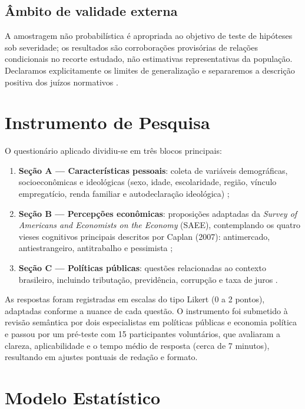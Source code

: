 \subsection{Âmbito de validade externa}
A amostragem não probabilística é apropriada ao objetivo de teste de hipóteses sob severidade; os resultados são corroborações provisórias de relações condicionais no recorte estudado, não estimativas representativas da população. Declaramos explicitamente os limites de generalização e separaremos a descrição positiva dos juízos normativos \cite{hausman2008}.


\section{Instrumento de Pesquisa}

O questionário aplicado dividiu-se em três blocos principais:
\begin{enumerate}[label=\alph*)]
    \item \textbf{Seção A — Características pessoais}: coleta de variáveis demográficas, socioeconômicas e ideológicas (sexo, idade, escolaridade, região, vínculo empregatício, renda familiar e autodeclaração ideológica) \cite{downs1957economic,kahan2012polarization};
    \item \textbf{Seção B — Percepções econômicas}: proposições adaptadas da \textit{Survey of Americans and Economists on the Economy} (SAEE), contemplando os quatro vieses cognitivos principais descritos por Caplan (2007): antimercado, antiestrangeiro, antitrabalho e pessimista \cite{blendon1997,Systematically_Biased_Beliefs_about_Economics};
    \item \textbf{Seção C — Políticas públicas}: questões relacionadas ao contexto brasileiro, incluindo tributação, previdência, corrupção e taxa de juros \cite{franco2017moeda,sowell2004applied,zaller1992nature}.
\end{enumerate}

As respostas foram registradas em escalas do tipo Likert (0 a 2 pontos), adaptadas conforme a nuance de cada questão. O instrumento foi submetido à revisão semântica por dois especialistas em políticas públicas e economia política e passou por um pré-teste com 15 participantes voluntários, que avaliaram a clareza, aplicabilidade e o tempo médio de resposta (cerca de 7 minutos), resultando em ajustes pontuais de redação e formato.

\section{Modelo Estatístico}\label{sec:modelo-estatistico}

